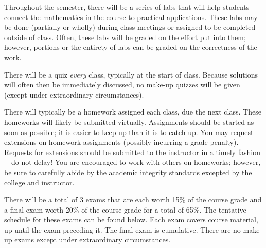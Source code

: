 \documentclass[11pt,letterpaper]{article}
\begin{document}
Throughout the semester, there will be a series of labs that will help students connect the mathematics in the course to practical applications. These labs may be done (partially or wholly) during class meetings or assigned to be completed outside of class. Often, these labs will be graded on the effort put into them; however, portions or the entirety of labs can be graded on the correctness of the work. \pspace

There will be a quiz \textit{every} class, typically at the start of class. Because solutions will often then be immediately discussed, no make-up quizzes will be given (except under extraordinary circumstances). \pspace


There will typically be a homework assigned each class, due the next class. These homeworks will likely be submitted virtually. Assignments should be started as soon as possible; it is easier to keep up than it is to catch up. You may request extensions on homework assignments (possibly incurring a grade penalty). Requests for extensions should be submitted to the instructor in a timely fashion---do not delay! You are encouraged to work with others on homeworks; however, be sure to carefully abide by the academic integrity standards excepted by the college and instructor. \pspace


There will be a total of 3 exams that are each worth 15\% of the course grade and a final exam worth 20\% of the course grade for a total of 65\%. The tentative schedule for these exams can be found below. Each exam covers course material, up until the exam preceding it. The final exam is cumulative. There are no make-up exams except under extraordinary circumstances. \pspace
\end{document}
